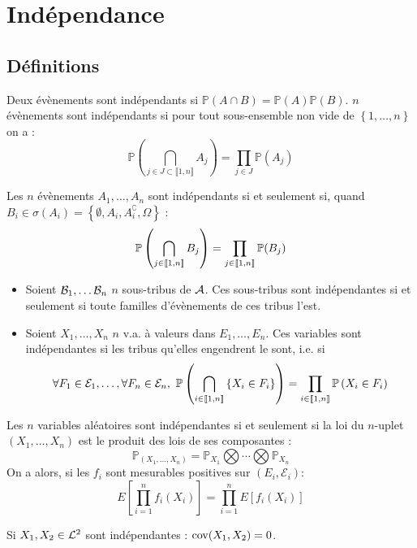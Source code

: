 \documentclass{cours}
\begin{document}
\section{Indépendance}
\subsection{Définitions}
\begin{definition}
    Deux évènements sont indépendants si $\mathbb{P}(A\cap B) = \mathbb{P}(A)\mathbb{P}(B)$. $n$ évènements sont indépendants si pour tout sous-ensemble non vide de $\left\{1, \ldots, n\right\}$ on a :
    \[
        \mathbb{P}\left(\bigcap_{j \in J \subset \llbracket 1, n\rrbracket} A_{j}\right) = \prod_{j \in J} \mathbb{P}(A_{j})
    \]
\end{definition}

\begin{proposition}
    Les $n$ évènements $A_{1}, \ldots, A_{n}$ sont indépendants si et seulement si, quand $B_{i} \in \sigma\left(A_{i}\right) = \left\{\emptyset, A_{i}, A_{i}^{\complement}, \Omega\right\}$ :
    \[
        \mathbb{P}\left(\bigcap_{j \in \left\llbracket 1, n\right\rrbracket} B_{j}\right) = \prod_{j \in \left\llbracket 1, n\right\rrbracket} \mathbb{P}(B_{j})
    \]
\end{proposition}

\begin{definition}
    \begin{itemize}
        \item Soient $\mathcal{B}_{1}, \ldots \mathcal{B}_{n}$ $n$ sous-tribus de $\mathcal{A}$. Ces sous-tribus sont indépendantes si et seulement si toute familles d'évènements de ces tribus l'est.
        \item Soient $X_{1}, \ldots, X_{n}$ $n$ v.a. à valeurs dans $E_{1}, \ldots, E_{n}$. Ces variables sont indépendantes si les tribus qu'elles engendrent le sont, i.e. si
              \[
                  \forall F_{1} \in \mathcal{E}_{1}, \ldots, \forall F_{n} \in \mathcal{E}_{n}, \ \mathbb{P}\left(\bigcap_{i \in \onen{n}}\left\{X_{i} \in F_{i}\right\}\right) = \prod_{i \in \onen{n}} \mathbb{P}\left(X_{i} \in F_{i}\right)
              \]
    \end{itemize}
\end{definition}

\begin{theorem}
    Les $n$ variables aléatoires sont indépendantes si et seulement si la loi du $n$-uplet $\left(X_{1}, \ldots, X_{n}\right)$ est le produit des lois de ses composantes :
    \[
        \mathbb{P}_{\left(X_{1}, \ldots, X_{n}\right)} = \mathbb{P}_{X_{1}} \bigotimes \cdots \bigotimes \mathbb{P}_{X_{n}}
    \]
    On a alors, si les $f_{i}$ sont mesurables positives sur $\left(E_{i}, \mathcal{E}_{i}\right)$:
    \[
        E\left[\prod_{i = 1}^{n}f_{i}(X_{i})\right] = \prod_{i = 1}^{n} E\left[f_{i}(X_{i})\right]
    \]
\end{theorem}
\begin{corollary}
    Si $X_{1}, X_{2} \in \mathcal{L}^{2}$ sont indépendantes : $\operatorname{cov}(X_{1}, X_{2}) = 0$.
\end{corollary}
\end{document}
